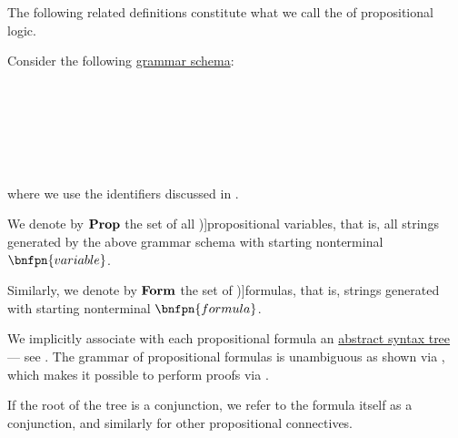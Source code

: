\begin{definition}\label{def:propositional_syntax}\mimprovised
  The following related definitions constitute what we call the  of propositional logic.

  \begin{thmenum}
     Consider the following \hyperref[def:formal_grammar/schema]{grammar schema}:
    \begin{bnf*}
                 {} \\
               {\bnftsq{\( \synvee \)} \bnfor \bnftsq{\( \synwedge \)} \bnfor \bnftsq{\( \synimplies \)} \bnfor \bnftsq{\( \syniff \)}} \\
                  {\bnftsq{\( \syntop \)} \bnfor \bnftsq{\( \synbot \)} \bnfor} \\
       \\
       \\
    \end{bnf*}
    where we use the identifiers discussed in .


     We denote by \( \operatorname{\mathbf{Prop}} \) the set of all \term[ru=пропозициональные переменные (\cite[43]{КолмогоровДрагалин2006})]{propositional variables}, that is, all strings generated by the above grammar schema with starting nonterminal \( \bnfpn{variable} \).

     Similarly, we denote by \( \operatorname{\mathbf{Form}} \) the set of \term[ru=формула (\cite[43]{КолмогоровДрагалин2006})]{formulas}, that is, strings generated with starting nonterminal \( \bnfpn{formula} \).

    We implicitly associate with each propositional formula an \hyperref[rem:abstract_syntax_tree]{abstract syntax tree} --- see . The grammar of propositional formulas is unambiguous as shown via , which makes it possible to perform proofs via .

    If the root of the tree is a conjunction, we refer to the formula itself as a conjunction, and similarly for other propositional connectives.


\end{thmenum}
\end{definition}
